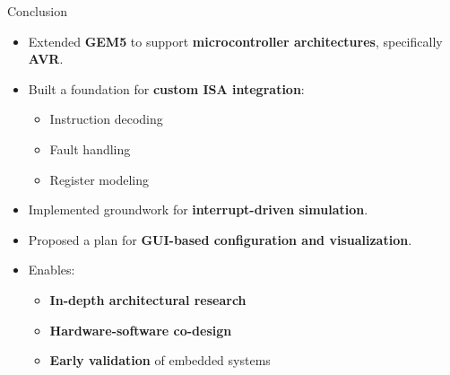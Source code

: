 \begin{frame}{Conclusion}
  \begin{itemize}
      \item Extended \textbf{GEM5} to support \textbf{microcontroller architectures}, specifically \textbf{AVR}.
      \item Built a foundation for \textbf{custom ISA integration}:
      \begin{itemize}
          \item Instruction decoding
          \item Fault handling
          \item Register modeling
      \end{itemize}
      \item Implemented groundwork for \textbf{interrupt-driven simulation}.
      \item Proposed a plan for \textbf{GUI-based configuration and visualization}.
      \item Enables:
      \begin{itemize}
          \item \textbf{In-depth architectural research}
          \item \textbf{Hardware-software co-design}
          \item \textbf{Early validation} of embedded systems
      \end{itemize}
  \end{itemize}
\end{frame}
